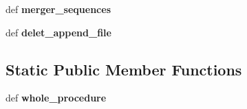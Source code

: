 \begin{DoxyCompactItemize}
\item 
\hypertarget{classsrc_1_1core_1_1execution_1_1MakeDatasetRbp_1_1MakeDatasetRbp_a92489d16d6f9352b52730b26b146a5b8}{def {\bfseries merger\-\_\-sequences}}\label{classsrc_1_1core_1_1execution_1_1MakeDatasetRbp_1_1MakeDatasetRbp_a92489d16d6f9352b52730b26b146a5b8}

\item 
\hypertarget{classsrc_1_1core_1_1execution_1_1MakeDatasetRbp_1_1MakeDatasetRbp_a039e12a82cd9269ad18e25d267f1c0a9}{def {\bfseries delet\-\_\-append\-\_\-file}}\label{classsrc_1_1core_1_1execution_1_1MakeDatasetRbp_1_1MakeDatasetRbp_a039e12a82cd9269ad18e25d267f1c0a9}

\end{DoxyCompactItemize}
\subsection*{Static Public Member Functions}
\begin{DoxyCompactItemize}
\item 
\hypertarget{classsrc_1_1core_1_1execution_1_1MakeDatasetRbp_1_1MakeDatasetRbp_a473df3fd137882a894070e933e308230}{def {\bfseries whole\-\_\-procedure}}\label{classsrc_1_1core_1_1execution_1_1MakeDatasetRbp_1_1MakeDatasetRbp_a473df3fd137882a894070e933e308230}

\end{DoxyCompactItemize}
